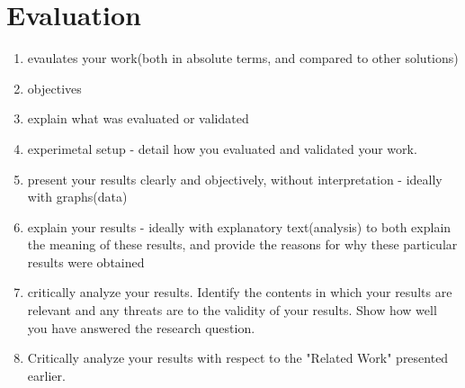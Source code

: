 \chapter{Evaluation}

\begin{enumerate}
    \item evaulates your work(both in absolute terms, and compared to other solutions)
    \item objectives
    \item explain what was evaluated or validated
    \item experimetal setup - detail how you evaluated and validated your work.
    \item present your results clearly and objectively, without interpretation - ideally with graphs(data)
    \item explain your results - ideally with explanatory text(analysis) to both explain the meaning of these results, and provide the reasons for why these particular results were obtained
    \item critically analyze your results. Identify the contents in which your results are relevant and any threats are to the validity of your results. Show how well you have answered the research question.
    \item Critically analyze your results with respect to the "Related Work" presented earlier.
\end{enumerate}